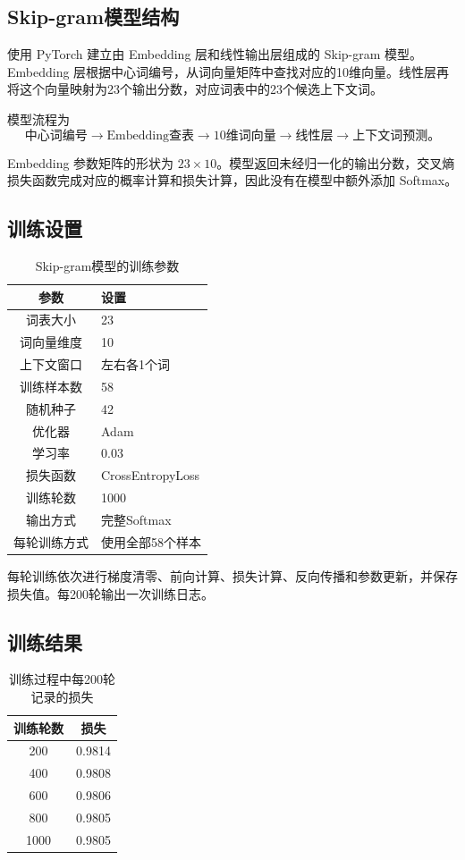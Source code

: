 \documentclass[UTF8,a4paper,zihao=-4,fontset=none]{ctexart}
\newcommand{\ReportTableHead}[1]{\textbf{#1}}
\begin{document}
\subsection{Skip-gram模型结构}

使用 PyTorch 建立由 Embedding 层和线性输出层组成的 Skip-gram 模型。Embedding 层根据中心词编号，从词向量矩阵中查找对应的10维向量。线性层再将这个向量映射为23个输出分数，对应词表中的23个候选上下文词。

模型流程为
\[
\text{中心词编号}\to\text{Embedding查表}\to\text{10维词向量}\to\text{线性层}\to\text{上下文词预测。}
\]

Embedding 参数矩阵的形状为 $23\times10$。模型返回未经归一化的输出分数，交叉熵损失函数完成对应的概率计算和损失计算，因此没有在模型中额外添加 Softmax。

\subsection{训练设置}

\begin{table}[htbp]
\centering\small
\caption{Skip-gram模型的训练参数}\label{tab:parameters}
\begin{tabularx}{\linewidth}{cY}
\toprule
\ReportTableHead{参数} & \ReportTableHead{设置}\\
\midrule
词表大小 & 23\\
词向量维度 & 10\\
上下文窗口 & 左右各1个词\\
训练样本数 & 58\\
随机种子 & 42\\
优化器 & Adam\\
学习率 & 0.03\\
损失函数 & CrossEntropyLoss\\
训练轮数 & 1000\\
输出方式 & 完整Softmax\\
每轮训练方式 & 使用全部58个样本\\
\bottomrule
\end{tabularx}
\end{table}

每轮训练依次进行梯度清零、前向计算、损失计算、反向传播和参数更新，并保存损失值。每200轮输出一次训练日志。

\subsection{训练结果}

\begin{table}[htbp]
\centering\small
\caption{训练过程中每200轮记录的损失}\label{tab:loss}
\begin{tabular}{cc}
\toprule
\ReportTableHead{训练轮数} & \ReportTableHead{损失}\\
\midrule
200 & 0.9814\\
400 & 0.9808\\
600 & 0.9806\\
800 & 0.9805\\
1000 & 0.9805\\
\bottomrule
\end{tabular}
\end{table}
\end{document}
